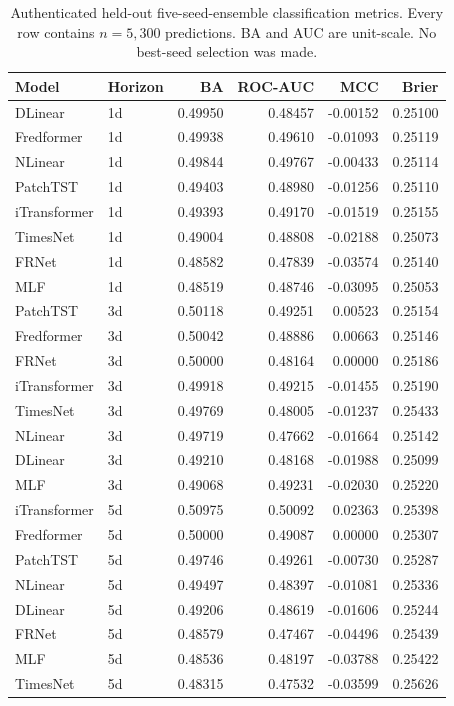 \documentclass[fleqn,10pt]{wlscirep}
\begin{document}
\begin{table}[htbp]\centering\scriptsize
\caption{Authenticated held-out five-seed-ensemble classification metrics. Every row contains $n=5,300$ predictions. BA and AUC are unit-scale. No best-seed selection was made.}\label{tab:neural}
\begin{tabular}{@{}llrrrr@{}}\toprule
Model & Horizon & BA & ROC-AUC & MCC & Brier \\ \midrule
DLinear & 1d & 0.49950 & 0.48457 & -0.00152 & 0.25100 \\
Fredformer & 1d & 0.49938 & 0.49610 & -0.01093 & 0.25119 \\
NLinear & 1d & 0.49844 & 0.49767 & -0.00433 & 0.25114 \\
PatchTST & 1d & 0.49403 & 0.48980 & -0.01256 & 0.25110 \\
iTransformer & 1d & 0.49393 & 0.49170 & -0.01519 & 0.25155 \\
TimesNet & 1d & 0.49004 & 0.48808 & -0.02188 & 0.25073 \\
FRNet & 1d & 0.48582 & 0.47839 & -0.03574 & 0.25140 \\
MLF & 1d & 0.48519 & 0.48746 & -0.03095 & 0.25053 \\
\addlinespace[2pt]
PatchTST & 3d & 0.50118 & 0.49251 & 0.00523 & 0.25154 \\
Fredformer & 3d & 0.50042 & 0.48886 & 0.00663 & 0.25146 \\
FRNet & 3d & 0.50000 & 0.48164 & 0.00000 & 0.25186 \\
iTransformer & 3d & 0.49918 & 0.49215 & -0.01455 & 0.25190 \\
TimesNet & 3d & 0.49769 & 0.48005 & -0.01237 & 0.25433 \\
NLinear & 3d & 0.49719 & 0.47662 & -0.01664 & 0.25142 \\
DLinear & 3d & 0.49210 & 0.48168 & -0.01988 & 0.25099 \\
MLF & 3d & 0.49068 & 0.49231 & -0.02030 & 0.25220 \\
\addlinespace[2pt]
iTransformer & 5d & 0.50975 & 0.50092 & 0.02363 & 0.25398 \\
Fredformer & 5d & 0.50000 & 0.49087 & 0.00000 & 0.25307 \\
PatchTST & 5d & 0.49746 & 0.49261 & -0.00730 & 0.25287 \\
NLinear & 5d & 0.49497 & 0.48397 & -0.01081 & 0.25336 \\
DLinear & 5d & 0.49206 & 0.48619 & -0.01606 & 0.25244 \\
FRNet & 5d & 0.48579 & 0.47467 & -0.04496 & 0.25439 \\
MLF & 5d & 0.48536 & 0.48197 & -0.03788 & 0.25422 \\
TimesNet & 5d & 0.48315 & 0.47532 & -0.03599 & 0.25626 \\
\bottomrule\end{tabular}
\end{table}
\end{document}
